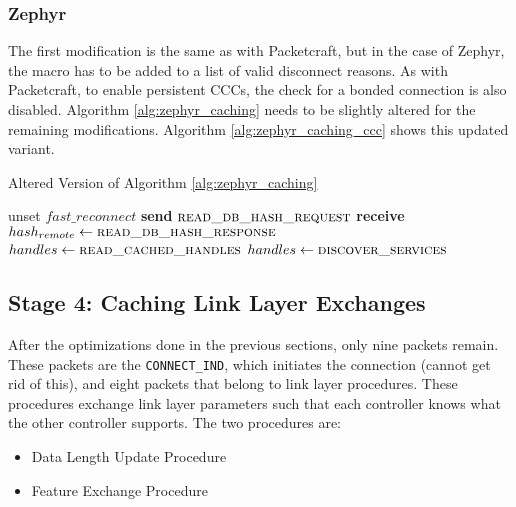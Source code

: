 \subsubsection{Zephyr}
The first modification is the same as with Packetcraft, but in the case of Zephyr, the macro has to be added to a list of valid disconnect reasons. As with Packetcraft, to enable persistent CCCs, the check for a bonded connection is also disabled. Algorithm \ref{alg:zephyr_caching} needs to be slightly altered for the remaining modifications. Algorithm \ref{alg:zephyr_caching_ccc} shows this updated variant.

\begin{algorithm}
    \caption{Altered Version of Algorithm \ref{alg:zephyr_caching}}
    \label{alg:zephyr_caching_ccc}
    \begin{algorithmic}[1] 
                \State unset $fast\_reconnect$
                \State \Return
            \EndIf
            \State \textbf{send} $\Call{read\_db\_hash\_request}{}$
            \State \textbf{receive} $hash_{remote} \gets \Call{read\_db\_hash\_response}{}$
                    \State $handles \gets \Call{read\_cached\_handles}{}$
                    \State {}
                    \State \Return
                \EndIf
            \EndIf
            \State $handles \gets\Call{discover\_services}{}$
            \State {}
            \State {}
        \EndProcedure
    \end{algorithmic}
\end{algorithm}


\subsection{Stage 4: Caching Link Layer Exchanges}
After the optimizations done in the previous sections, only nine packets remain. These packets are the \texttt{CONNECT\_IND}, which initiates the connection (cannot get rid of this), and eight packets that belong to link layer procedures. These procedures exchange link layer parameters such that each controller knows what the other controller supports. The two procedures are:
\begin{itemize}
    \item Data Length Update Procedure
    \item Feature Exchange Procedure
\end{itemize}

